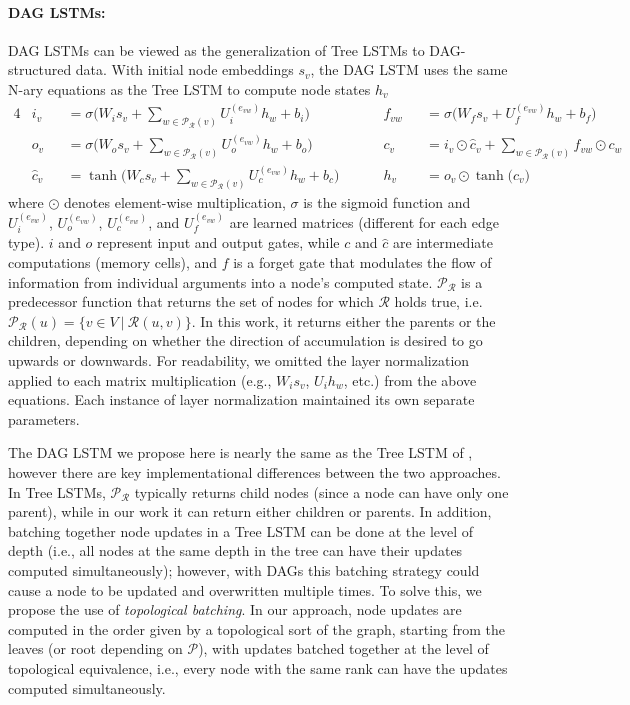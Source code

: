 \documentclass{article}
\begin{document}
\paragraph{DAG LSTMs:} DAG LSTMs can be viewed as the generalization of Tree LSTMs \cite{tai2015improved} to DAG-structured data. With initial node embeddings $s_v$, the DAG LSTM uses the same N-ary equations as the Tree LSTM to compute node states $h_v$
\begin{alignat*}{4}
    &i_v &&= \sigma \big( W_i s_v + \sum_{w \in \mathcal{P}_\mathcal{R}(v)} U_i^{(e_{vw})} h_w + b_i \big) \ \ \ \ \ \ \ &&f_{vw} &&= \sigma \big( W_f s_v + U_f^{(e_{vw})} h_w + b_f \big) \\
    &o_v &&= \sigma \big( W_o s_v + \sum_{w \in \mathcal{P}_\mathcal{R}(v)} U_o^{(e_{vw})} h_w + b_o \big) \ \ \ \ \ \ \ &&c_{v} &&= i_v \odot \hat{c}_v + \sum_{w \in \mathcal{P}_\mathcal{R}(v)} f_{vw} \odot c_{w} \\
    &\hat{c}_v &&= \tanh{ \big( W_c s_v + \sum_{w \in \mathcal{P}_\mathcal{R}(v)} U_c^{(e_{vw})} h_w + b_c \big) } \ \ \ \ \ \ \ &&h_{v} &&= o_v \odot \tanh{\big(c_v\big)}
\end{alignat*}
where $\odot$ denotes element-wise multiplication, $\sigma$ is the sigmoid function and $U_i^{(e_{vw})}$, $U_o^{(e_{vw})}$, $U_c^{(e_{vw})}$, and $U_f^{(e_{vw})}$ are learned matrices (different for each edge type). $i$ and $o$ represent input and output gates, while $c$ and $\hat{c}$ are intermediate computations (memory cells), and $f$ is a forget gate that modulates the flow of information from individual arguments into a node's computed state. $\mathcal{P}_\mathcal{R}$ is a predecessor function that returns the set of nodes for which $\mathcal{R}$ holds true, i.e. $\mathcal{P}_\mathcal{R}(u) = \{ v \in V \ | \ \mathcal{R}(u, v) \}$. In this work, it returns either the parents or the children, depending on whether the direction of accumulation is desired to go upwards or downwards. For readability, we omitted the layer normalization \cite{ba2016layer} applied to each matrix multiplication (e.g., $W_i s_v$, $U_i h_w$, etc.) from the above equations. Each instance of layer normalization maintained its own separate parameters.


The DAG LSTM we propose here is nearly the same as the Tree LSTM of \cite{tai2015improved}, however there are key implementational differences between the two approaches. In Tree LSTMs, $\mathcal{P}_\mathcal{R}$ typically returns child nodes (since a node can have only one parent), while in our work it can return either children or parents. In addition, batching together node updates in a Tree LSTM can be done at the level of depth (i.e., all nodes at the same depth in the tree can have their updates computed simultaneously); however, with DAGs this batching strategy could cause a node to be updated and overwritten multiple times. To solve this, we propose the use of \emph{topological batching}. In our approach, node updates are computed in the order given by a topological sort of the graph, starting from the leaves (or root depending on $\mathcal{P}$), with updates batched together at the level of topological equivalence, i.e., every node with the same rank can have the updates computed simultaneously.
\end{document}

